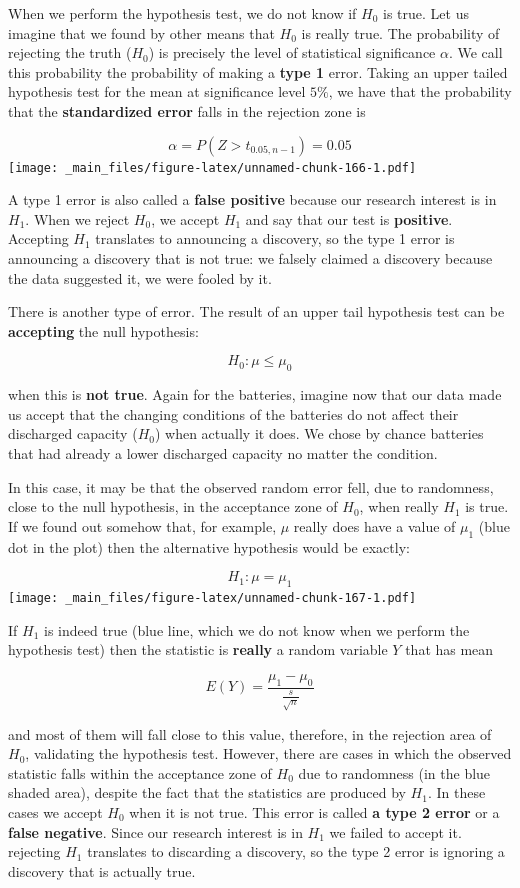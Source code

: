 \documentclass[
]{book}
\begin{document}
When we perform the hypothesis test, we do not know if \(H_0\) is true. Let us imagine that we found by other means that \(H_0\) is really true. The probability of rejecting the truth (\(H_0\)) is precisely the level of statistical significance \(\alpha\). We call this probability the probability of making a \textbf{type 1} error.
Taking an upper tailed hypothesis test for the mean at significance level \(5\%\), we have that the probability that the \textbf{standardized error} falls in the rejection zone is

\[\alpha = P(Z> t_{0.05, n-1})=0.05\]
\texttt{[image: \_main\_files/figure-latex/unnamed-chunk-166-1.pdf]}

A type 1 error is also called a \textbf{false positive} because our research interest is in \(H_1\). When we reject \(H_0\), we accept \(H_1\) and say that our test is \textbf{positive}. Accepting \(H_1\) translates to announcing a discovery, so the type 1 error is announcing a discovery that is not true: we falsely claimed a discovery because the data suggested it, we were fooled by it.

There is another type of error. The result of an upper tail hypothesis test can be \textbf{accepting} the null hypothesis:

\[H_0: \mu\leq\mu_0\]

when this is \textbf{not true}. Again for the batteries, imagine now that our data made us accept that the changing conditions of the batteries do not affect their discharged capacity (\(H_0\)) when actually it does. We chose by chance batteries that had already a lower discharged capacity no matter the condition.

In this case, it may be that the observed random error fell, due to randomness, close to the null hypothesis, in the acceptance zone of \(H_0\), when really \(H_1\) is true. If we found out somehow that, for example, \(\mu\) really does have a value of \(\mu_1\) (blue dot in the plot) then the alternative hypothesis would be exactly:

\[H_1: \mu=\mu_1\]
\texttt{[image: \_main\_files/figure-latex/unnamed-chunk-167-1.pdf]}

If \(H_1\) is indeed true (blue line, which we do not know when we perform the hypothesis test) then the statistic is \textbf{really} a random variable \(Y\) that has mean

\[E(Y)=\frac{\mu_1-\mu_0}{\frac{s}{\sqrt{n}}}\]

and most of them will fall close to this value, therefore, in the rejection area of \(H_0\), validating the hypothesis test. However, there are cases in which the observed statistic falls within the acceptance zone of \(H_0\) due to randomness (in the blue shaded area), despite the fact that the statistics are produced by \(H_1\). In these cases we accept \(H_0\) when it is not true. This error is called \textbf{a type 2 error} or a \textbf{false negative}. Since our research interest is in \(H_1\) we failed to accept it. rejecting \(H_1\) translates to discarding a discovery, so the type 2 error is ignoring a discovery that is actually true.
\end{document}
